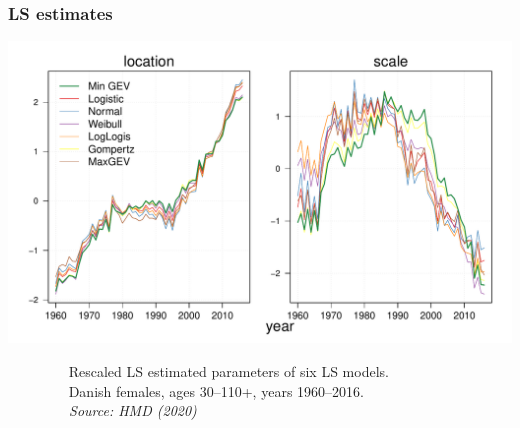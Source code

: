 \documentclass[12pt, xcolor=table]{beamer}  %
\begin{document}
\begin{frame}[noframenumbering]
\frametitle{LS estimates}
\vspace{-0.25cm}
\begin{center}
\includegraphics[scale=0.45]{Figures/Ch1/F4_b}
\end{center}
\vspace{-0.3cm}
\tiny{$\quad\quad\quad\quad$ Rescaled LS estimated parameters of six LS models.\\ $\quad\quad\quad\quad$ Danish females, ages 30--110+, years 1960--2016. \\ \emph{$\quad\quad\quad\quad$ Source: HMD (2020)}} 

\end{frame}
\end{document}
